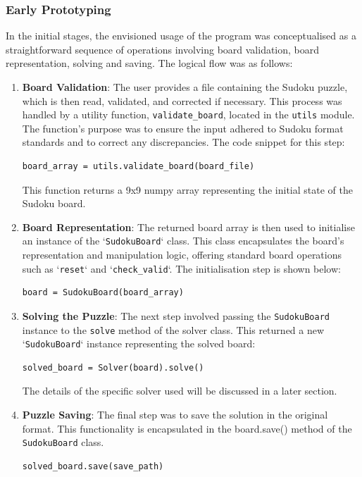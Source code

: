 \documentclass[11pt]{article}
\begin{document}
\subsubsection{Early Prototyping}
In the initial stages, the envisioned usage of the program was conceptualised as a straightforward sequence of operations involving board validation, board representation, solving and saving. The logical flow was as follows:

\begin{enumerate}
\item \textbf{Board Validation}: The user provides a file containing the Sudoku puzzle, which is then read, validated, and corrected if necessary. This process was handled by a utility function, \texttt{validate\_board}, located in the \texttt{utils} module. The function's purpose was to ensure the input adhered to Sudoku format standards and to correct any discrepancies. The code snippet for this step:
\begin{verbatim}
board_array = utils.validate_board(board_file)
\end{verbatim}
This function returns a 9x9 numpy array representing the initial state of the Sudoku board.

\item \textbf{Board Representation}: The returned board array is then used to initialise an instance of the `\texttt{SudokuBoard}` class. This class encapsulates the board's representation and manipulation logic, offering standard board operations such as `\texttt{reset}` and `\texttt{check\_valid}`. The initialisation step is shown below:
\begin{verbatim}
board = SudokuBoard(board_array)
\end{verbatim}

\item \textbf{Solving the Puzzle}: The next step involved passing the \texttt{SudokuBoard} instance to the \texttt{solve} method of the solver class. This returned a new `\texttt{SudokuBoard}` instance representing the solved board:
\begin{verbatim}
solved_board = Solver(board).solve()
\end{verbatim}
The details of the specific solver used will be discussed in a later section.

\item \textbf{Puzzle Saving}: The final step was to save the solution in the original format. This functionality is encapsulated in the board.save() method of the \texttt{SudokuBoard} class. 
\begin{verbatim}
solved_board.save(save_path)
\end{verbatim}
\end{enumerate}
\end{document}
